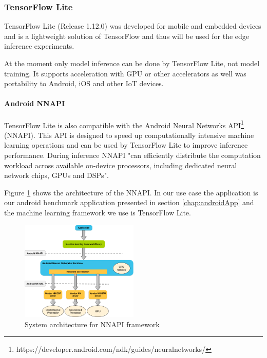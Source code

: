 \subsubsection{TensorFlow Lite}
\label{chap:TFLite}
TensorFlow Lite (Release 1.12.0) was developed for mobile and embedded devices and is a lightweight solution of TensorFlow and thus will be used for the edge inference experiments.

At the moment only model inference can be done by TensorFlow Lite, not model training.
It supports acceleration with GPU or other accelerators as well was portability to Android, iOS and other IoT devices.

\paragraph{Android NNAPI}
\label{chap:NNAPI}
TensorFlow Lite is also compatible with the Android Neural Networks API\footnote{https://developer.android.com/ndk/guides/neuralnetworks/} (NNAPI). This API
is designed to speed up computationally intensive machine learning operations and can be used by TensorFlow Lite to improve inference performance. During inference NNAPI "can
efficiently distribute the computation workload across available on-device processors, including dedicated neural network chips, GPUs and DSPs"\cite{DBLP:journals/corr/abs-1810-01109}.

Figure \ref{fig:NNAPIarchitecture} shows the architecture of the NNAPI. In our use case the application is our android benchmark application presented in section \ref{chap:androidApp} and the machine learning framework we use is TensorFlow Lite.
\begin{figure}[!htb]
\centering
\includegraphics[width=0.5\textwidth]{./Bilder/nnapi_architecture.png}
\caption{System architecture for NNAPI framework \cite{NNAPI}}
\label{fig:NNAPIarchitecture}
\end{figure}


